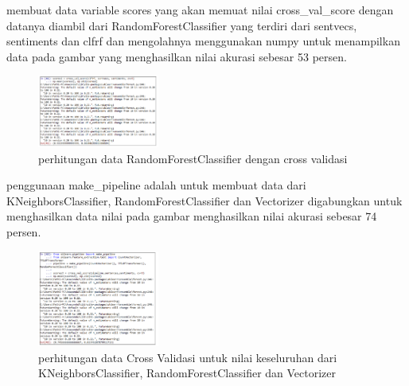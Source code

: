 \begin{enumerate}
        \subitem membuat data variable scores yang akan memuat nilai cross\_val\_score dengan datanya diambil dari RandomForestClassifier yang terdiri dari sentvecs, sentiments dan clfrf dan mengolahnya menggunakan numpy untuk menampilkan data pada gambar yang menghasilkan nilai akurasi sebesar 53 persen. 
        \begin{figure}[H]
            \includegraphics[width=4cm]{figures/1174039/chapter5/33.png}
            \centering
            \caption{perhitungan data  RandomForestClassifier dengan cross validasi}
        \end{figure}
        
        \subitem penggunaan make\_pipeline adalah untuk membuat data dari KNeighborsClassifier, RandomForestClassifier dan Vectorizer digabungkan untuk menghasilkan data nilai pada gambar menghasilkan nilai akurasi sebesar 74 persen. 
        \begin{figure}[H]
            \includegraphics[width=4cm]{figures/1174039/chapter5/34.png}
            \centering
            \caption{perhitungan data Cross Validasi untuk nilai keseluruhan dari KNeighborsClassifier, RandomForestClassifier dan Vectorizer}
        \end{figure}
        
        \end{enumerate}